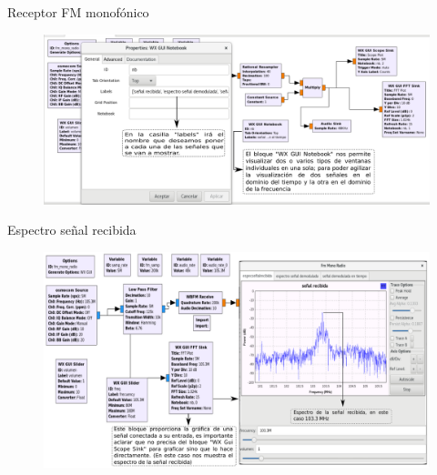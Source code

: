\begin{frame}{Receptor FM monofónico}

\begin{figure}[H]
\centering
\vspace{-3mm}
\includegraphics[width=\textwidth]{parte3/lab8/pdf/lab8_8.pdf}
\end{figure}

\end{frame}

\begin{frame}{Espectro señal recibida}

\begin{figure}[H]
\centering
\vspace{-3mm}
\includegraphics[width=\textwidth]{parte3/lab8/pdf/lab8_9.pdf}
\end{figure}

\end{frame}


